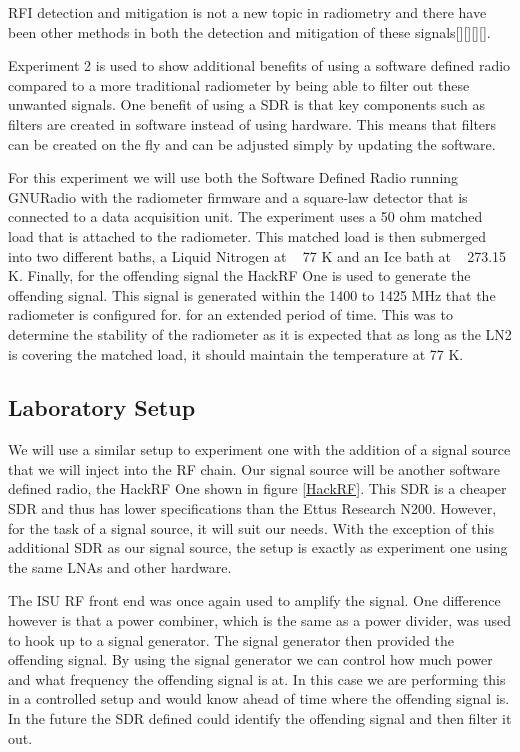 RFI detection and mitigation is not a new topic in radiometry and there have been other methods in both the detection and mitigation of these signals[\cite{Forte}][\cite{McIntyre_RFI}][\cite{DeRoo}][\cite{Ellingson}].

Experiment 2 is used to show additional benefits of using a software defined radio compared to a more traditional radiometer by being able to filter out these unwanted signals.  One benefit of using a SDR is that key components such as filters are created in software instead of using hardware.  This means that filters can be created on the fly and can be adjusted simply by updating the software.  

For this experiment we will use both the Software Defined Radio running GNURadio with the radiometer firmware and a square-law detector that is connected to a data acquisition unit.  The experiment uses a 50 ohm matched load that is attached to the radiometer.  This matched load is then submerged into two different baths, a Liquid Nitrogen at ~ 77 K and an Ice bath at ~ 273.15 K.  Finally, for the offending signal the HackRF One is used to generate the offending signal.  This signal is generated within the 1400 to 1425 MHz that the radiometer is configured for.   for an extended period of time.  This was to determine the stability of the radiometer as it is expected that as long as the LN2 is covering the matched load, it should maintain the temperature at 77 K.  

\subsection{Laboratory Setup}
We will use a similar setup to experiment one with the addition of a signal source that we will inject into the RF chain.  Our signal source will be another software defined radio, the HackRF One shown in figure \ref{HackRF}.  This SDR is a cheaper SDR and thus has lower specifications than the Ettus Research N200.  However, for the task of a signal source, it will suit our needs.  With the exception of this additional SDR as our signal source, the setup is exactly as experiment one using the same LNAs and other hardware.

The ISU RF front end was once again used to amplify the signal.  One difference however is that a power combiner, which is the same as a power divider, was used to hook up to a signal generator.  The signal generator then provided the offending signal.  By using the signal generator we can control how much power and what frequency the offending signal is at.  In this case we are performing this in a controlled setup and would know ahead of time where the offending signal is.  In the future the SDR defined could identify the offending signal and then filter it out.

